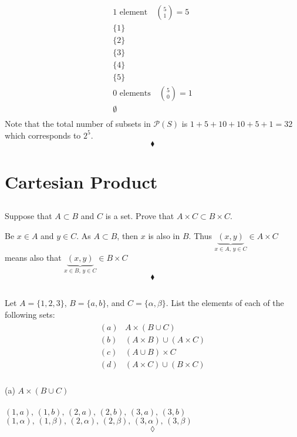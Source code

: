\begin{align*}
1\text{ element}\quad \binom{5}{1}= 5\\
\{1\}\\
\{2\}\\
\{3\}\\
\{4\}\\
\{5\}\\
0\text{ elements}\quad \binom{5}{0}= 1\\
\emptyset\\
\end{align*}
Note that the total number of subsets in $\mathscr{P}(S)$ is $1+5+10+10+5+1 = 32$ which corresponds to $2^5$.
$$\blacklozenge$$
\newpage

 \section{Cartesian Product}
\subsection{}
\begin{tcolorbox}
Suppose that $A\subset B$ and $C$ is a set. Prove that $A\times C\subset B\times C$.
\end{tcolorbox}
Be $x\in A$ and $y\in C$. As $A\subset B$, then $x$ is also in $B$. Thus $\underbrace{(x,y)}_{x\in A,\, y\in C}\in A\times C$ means also that $\underbrace{(x,y)}_{x\in B,\, y\in C}\in B\times C$
$$\blacklozenge$$

\subsection{}
\begin{tcolorbox}
Let $A=\{1,2,3\}$, $B=\{a,b\}$, and $C=\{\alpha,\beta\}$. List the elements of each of the following sets:
\begin{align*}
\begin{array}{ll}
(a)&A\times (B\cup C)\\
(b)&(A\times B)\cup(A\times C)\\
(c)&(A\cup B)\times C\\
(d)&(A\times C)\cup(B\times C)\\
\end{array}
\end{align*} 
\end{tcolorbox}
(a) $A\times (B\cup C)$\\\\
$(1,a),\,(1,b),\,(2,a),\,(2,b),\,(3,a),\,(3,b)$\\ 
$(1,\alpha),\,(1,\beta),\,(2,\alpha),\,(2,\beta),\,(3,\alpha),\,(3,\beta)$ 
$$\lozenge$$

